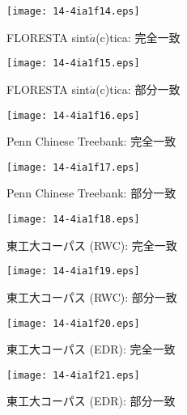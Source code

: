 \documentclass[japanese]{jnlp_1.3e}
\begin{document}
\begin{figure}[t]
\begin{minipage}{0.47\hsize}
\begin{center}
\texttt{[image: 14-4ia1f14.eps]}
      \caption{FLORESTA sint$\acute{a}$(c)tica: 完全一致}
      \label{fig:floresta-e}
\end{center}
\end{minipage}
\hfill
\begin{minipage}{0.47\hsize}
\begin{center}
\texttt{[image: 14-4ia1f15.eps]}
      \caption{FLORESTA sint$\acute{a}$(c)tica: 部分一致}
      \label{fig:floresta-p}
\end{center}
\end{minipage}
\end{figure}

\begin{figure}[t]
\begin{minipage}{0.47\hsize}
\begin{center}
\texttt{[image: 14-4ia1f16.eps]}
\caption{Penn Chinese Treebank: 完全一致}
\label{fig:chinese-e}
\end{center}
\end{minipage}
\hfill
\begin{minipage}{0.47\hsize}
\begin{center}
\texttt{[image: 14-4ia1f17.eps]}
      \caption{Penn Chinese Treebank: 部分一致}
      \label{fig:chinese-p}
\end{center}
\end{minipage}
\end{figure}


\begin{figure}[t]
\begin{minipage}{0.47\hsize}
\begin{center}
\texttt{[image: 14-4ia1f18.eps]}
      \caption{東工大コーパス (RWC): 完全一致}
      \label{fig:tit-rwc-e}
\end{center}
\end{minipage}
\hfill
\begin{minipage}{0.47\hsize}
\begin{center}
\texttt{[image: 14-4ia1f19.eps]}
      \caption{東工大コーパス (RWC): 部分一致}
      \label{fig:tit-rwc-p}
\end{center}
\end{minipage}
\end{figure}


\begin{figure}[t]
\begin{minipage}{0.47\hsize}
\begin{center}
\texttt{[image: 14-4ia1f20.eps]}
      \caption{東工大コーパス (EDR): 完全一致}
      \label{fig:tit-edr-e}
\end{center}
\end{minipage}
\hfill
\begin{minipage}{0.47\hsize}
\begin{center}
\texttt{[image: 14-4ia1f21.eps]}
      \caption{東工大コーパス (EDR): 部分一致}
      \label{fig:tit-edr-p}
\end{center}
\end{minipage}
\end{figure}
\end{document}
